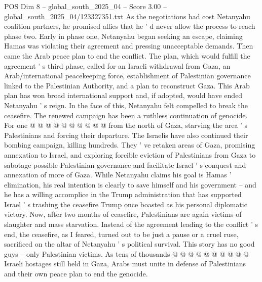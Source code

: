 \begin{textsample}{POS Dim 8 – global\_south\_2025\_04 – Score 3.00 – global\_south\_2025\_04/123327351.txt}
As the negotiations had cost Netanyahu coalition partners, he promised allies that he ' d never allow the process to reach phase two.
Early in phase one, Netanyahu began seeking an escape, claiming Hamas was violating their agreement and pressing unacceptable demands.
Then came the Arab peace plan to end the conflict.
The plan, which would fulfill the agreement ' s third phase, called for an Israeli withdrawal from Gaza, an Arab/international peacekeeping force, establishment of Palestinian governance linked to the Palestinian Authority, and a plan to reconstruct Gaza.
This Arab plan has won broad international support and, if adopted, would have ended Netanyahu ' s reign.
In the face of this, Netanyahu felt compelled to break the ceasefire.
The renewed campaign has been a ruthless continuation of genocide.
For one @ @ @ @ @ @ @ @ @ @ from the north of Gaza, starving the area ' s Palestinians and forcing their departure.
The Israelis have also continued their bombing campaign, killing hundreds.
They ' ve retaken areas of Gaza, promising annexation to Israel, and exploring forcible eviction of Palestinians from Gaza to sabotage possible Palestinian governance and facilitate Israel ' s conquest and annexation of more of Gaza.
While Netanyahu claims his goal is Hamas ' elimination, his real intention is clearly to save himself and his government -- and he has a willing accomplice in the Trump administration that has supported Israel ' s trashing the ceasefire Trump once boasted as his personal diplomatic victory.
Now, after two months of ceasefire, Palestinians are again victims of slaughter and mass starvation.
Instead of the agreement leading to the conflict ' s end, the ceasefire, as I feared, turned out to be just a pause or a cruel ruse, sacrificed on the altar of Netanyahu ' s political survival.
This story has no good guys -- only Palestinian victims.
As tens of thousands @ @ @ @ @ @ @ @ @ @ Israeli hostages still held in Gaza, Arabs must unite in defense of Palestinians and their own peace plan to end the genocide.

\end{textsample}
